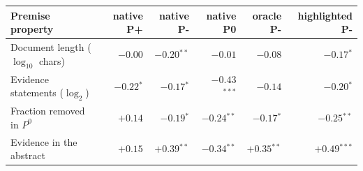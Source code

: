 \begin{tabularx}{\linewidth}{@{}Xrrrrr@{}}
\toprule
Premise property & native P+ & native P- & native P0 & oracle P- & highlighted P-\\
\midrule
Document length ($\log_{10}$ chars) & $-0.00$ & $-0.20$$^{**}$ & $-0.01$ & $-0.08$ & $-0.17$$^{*}$\\
Evidence statements ($\log_2$) & $-0.22$$^{*}$ & $-0.17$$^{*}$ & $-0.43$$^{***}$ & $-0.14$ & $-0.20$$^{*}$\\
Fraction removed in $P^{0}$ & $+0.14$ & $-0.19$$^{*}$ & $-0.24$$^{**}$ & $-0.17$$^{*}$ & $-0.25$$^{**}$\\
Evidence in the abstract & $+0.15$ & $+0.39$$^{**}$ & $-0.34$$^{**}$ & $+0.35$$^{**}$ & $+0.49$$^{***}$\\
\bottomrule
\end{tabularx}
